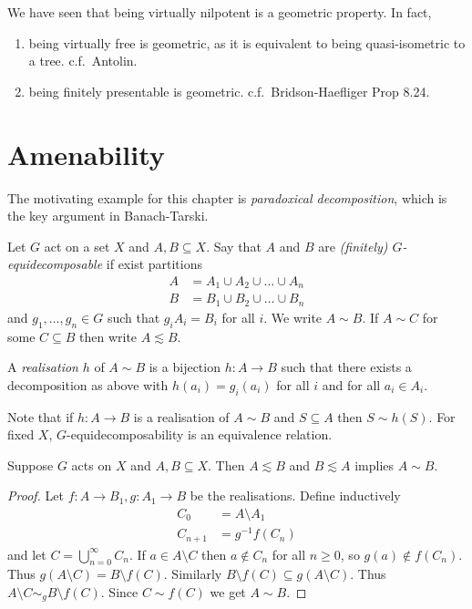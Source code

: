 \documentclass[a4paper]{article}
\begin{document}
\begin{remark}
  We have seen that being virtually nilpotent is a geometric property. In fact,
  \begin{enumerate}
  \item being virtually free is geometric, as it is equivalent to being quasi-isometric to a tree. c.f.\ Antolin.
  \item being finitely presentable is geometric. c.f.\ Bridson-Haefliger Prop 8.24.
  \end{enumerate}
\end{remark}

\section{Amenability}

The motivating example for this chapter is \emph{paradoxical decomposition}, which is the key argument in Banach-Tarski.

\begin{definition}[equidecomposable]
  Let \(G\) act on a set \(X\) and \(A, B \subseteq X\). Say that \(A\) and \(B\) are \emph{(finitely) \(G\)-equidecomposable} if exist partitions
  \begin{align*}
    A &= A_1 \cup A_2 \cup \dots \cup A_n \\
    B &= B_1 \cup B_2 \cup \dots \cup B_n
  \end{align*}
  and \(g_1, \dots, g_n \in G\) such that \(g_i A_i = B_i\) for all \(i\). We write \(A \sim B\). If \(A \sim C\) for some \(C \subseteq B\) then write \(A \lesssim B\).

  A \emph{realisation} \(h\) of \(A \sim B\) is a bijection \(h: A \to B\) such that there exists a decomposition as above with \(h(a_i) = g_i(a_i)\) for all \(i\) and for all \(a_i \in A_i\).
\end{definition}

Note that if \(h: A \to B\) is a realisation of \(A \sim B\) and \(S \subseteq A\) then \(S \sim h(S)\). For fixed \(X\), \(G\)-equidecomposability is an equivalence relation.

\begin{theorem}
  Suppose \(G\) acts on \(X\) and \(A, B \subseteq X\). Then \(A \lesssim B\) and \(B \lesssim A\) implies \(A \sim B\).
\end{theorem}

\begin{proof}
  Let \(f: A \to B_1, g: A_1 \to B\) be the realisations. Define inductively
  \begin{align*}
    C_0 &= A \setminus A_1 \\
    C_{n + 1} &= g^{-1} f(C_n)
  \end{align*}
  and let \(C = \bigcup_{n = 0}^\infty C_n\). If \(a \in A \setminus C\) then \(a \notin C_n\) for all \(n \geq 0\), so \(g(a) \notin f(C_n)\). Thus \(g(A \setminus C) = B \setminus f(C)\). Similarly \(B \setminus f(C) \subseteq g(A\setminus C)\). Thus \(A \setminus C \sim_g B \setminus f(C)\). Since \(C \sim f(C)\) we get \(A \sim B\).
\end{proof}
\end{document}
